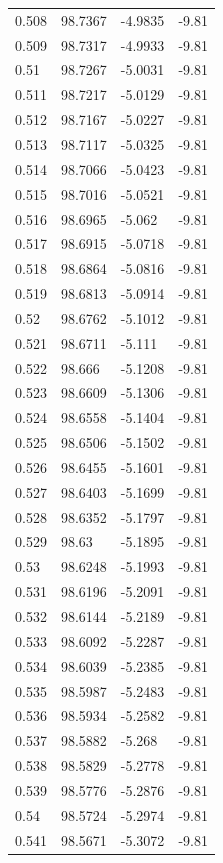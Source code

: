 \begin{tabular}{llll}
0.508 & 98.7367 & -4.9835 & -9.81 \\
0.509 & 98.7317 & -4.9933 & -9.81 \\
0.51 & 98.7267 & -5.0031 & -9.81 \\
0.511 & 98.7217 & -5.0129 & -9.81 \\
0.512 & 98.7167 & -5.0227 & -9.81 \\
0.513 & 98.7117 & -5.0325 & -9.81 \\
0.514 & 98.7066 & -5.0423 & -9.81 \\
0.515 & 98.7016 & -5.0521 & -9.81 \\
0.516 & 98.6965 & -5.062 & -9.81 \\
0.517 & 98.6915 & -5.0718 & -9.81 \\
0.518 & 98.6864 & -5.0816 & -9.81 \\
0.519 & 98.6813 & -5.0914 & -9.81 \\
0.52 & 98.6762 & -5.1012 & -9.81 \\
0.521 & 98.6711 & -5.111 & -9.81 \\
0.522 & 98.666 & -5.1208 & -9.81 \\
0.523 & 98.6609 & -5.1306 & -9.81 \\
0.524 & 98.6558 & -5.1404 & -9.81 \\
0.525 & 98.6506 & -5.1502 & -9.81 \\
0.526 & 98.6455 & -5.1601 & -9.81 \\
0.527 & 98.6403 & -5.1699 & -9.81 \\
0.528 & 98.6352 & -5.1797 & -9.81 \\
0.529 & 98.63 & -5.1895 & -9.81 \\
0.53 & 98.6248 & -5.1993 & -9.81 \\
0.531 & 98.6196 & -5.2091 & -9.81 \\
0.532 & 98.6144 & -5.2189 & -9.81 \\
0.533 & 98.6092 & -5.2287 & -9.81 \\
0.534 & 98.6039 & -5.2385 & -9.81 \\
0.535 & 98.5987 & -5.2483 & -9.81 \\
0.536 & 98.5934 & -5.2582 & -9.81 \\
0.537 & 98.5882 & -5.268 & -9.81 \\
0.538 & 98.5829 & -5.2778 & -9.81 \\
0.539 & 98.5776 & -5.2876 & -9.81 \\
0.54 & 98.5724 & -5.2974 & -9.81 \\
0.541 & 98.5671 & -5.3072 & -9.81 \\

\end{tabular}
